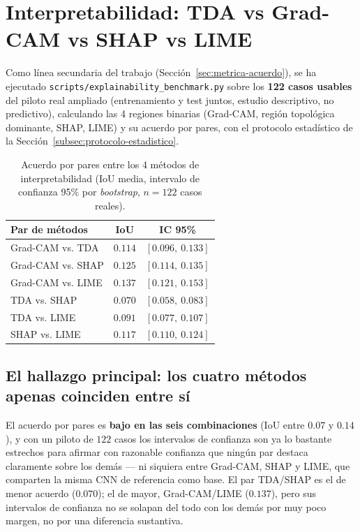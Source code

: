 \section{Interpretabilidad: TDA vs Grad-CAM vs SHAP vs LIME}
\label{sec:resultados-xai}
Como línea secundaria del trabajo (Sección~\ref{sec:metrica-acuerdo}), se ha
ejecutado \texttt{scripts/\allowbreak explainability\_\allowbreak benchmark.py} sobre los
\textbf{122 casos usables} del piloto real ampliado (entrenamiento y test
juntos, estudio descriptivo, no predictivo), calculando las 4 regiones
binarias (Grad-CAM, región topológica dominante, SHAP, LIME) y su acuerdo
por pares, con el protocolo estadístico de la
Sección~\ref{subsec:protocolo-estadistico}.

\begin{table}[H]
\centering
\caption{Acuerdo por pares entre los 4 métodos de interpretabilidad (IoU
media, intervalo de confianza 95\% por \textit{bootstrap}, $n=122$ casos
reales).}
\label{tab:xai-acuerdo}
\begin{tabular}{@{}lcc@{}}
\toprule
\textbf{Par de métodos} & \textbf{IoU} & \textbf{IC 95\%} \\
\midrule
Grad-CAM vs. TDA   & $0.114$ & $[0.096,\ 0.133]$ \\
Grad-CAM vs. SHAP  & $0.125$ & $[0.114,\ 0.135]$ \\
Grad-CAM vs. LIME  & $0.137$ & $[0.121,\ 0.153]$ \\
TDA vs. SHAP       & $0.070$ & $[0.058,\ 0.083]$ \\
TDA vs. LIME       & $0.091$ & $[0.077,\ 0.107]$ \\
SHAP vs. LIME      & $0.117$ & $[0.110,\ 0.124]$ \\
\bottomrule
\end{tabular}
\end{table}

\subsection{El hallazgo principal: los cuatro métodos apenas coinciden entre sí}
El acuerdo por pares es \textbf{bajo en las seis combinaciones} (IoU entre
$0.07$ y $0.14$), y con un piloto de $122$ casos los intervalos de
confianza son ya lo bastante estrechos para afirmar con razonable confianza
que ningún par destaca claramente sobre los demás --- ni siquiera entre
Grad-CAM, SHAP y LIME, que comparten la misma CNN de referencia como base.
El par TDA/SHAP es el de menor acuerdo ($0.070$); el de mayor, Grad-CAM/LIME
($0.137$), pero sus intervalos de confianza no se solapan del todo con los
demás por muy poco margen, no por una diferencia sustantiva.

